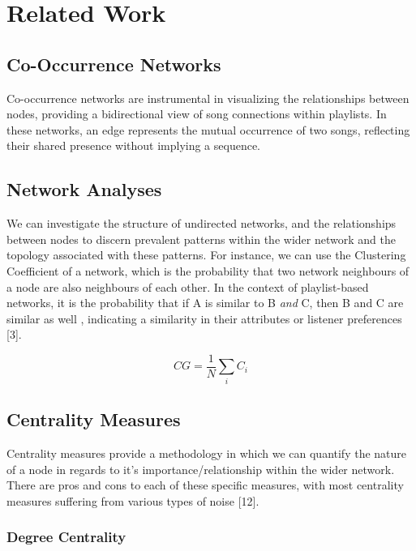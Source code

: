 \documentclass[conference]{IEEEtran}
\begin{document}
\section{Related Work}

\subsection{Co-Occurrence Networks}

Co-occurrence networks are instrumental in visualizing the relationships between nodes, providing a bidirectional view of song connections within playlists. In these networks, an edge represents the mutual occurrence of two songs, reflecting their shared presence without implying a sequence. 

\subsection{Network Analyses}

We can investigate the structure of undirected networks, and the relationships between nodes to discern prevalent patterns within the wider network and the topology associated with these patterns. For instance, we can use the Clustering Coefficient of a network, which is the probability that two network neighbours of a node are also neighbours of each other. In the context of playlist-based networks, it is the probability that if A is similar to B \textit{and} C, then B and C are similar as well , indicating a similarity in their attributes or listener preferences [3]. 

\begin{equation}
\label{}
CG = \frac{1}{N}\sum_{i} C_{i}
\end{equation}

\subsection{Centrality Measures}

Centrality measures provide a methodology in which we can quantify the nature of a node in regards to it's importance/relationship within the wider network. There are pros and cons to each of these specific measures, with most centrality measures suffering from various types of noise [12]. \\

\subsubsection{Degree Centrality}
\end{document}
